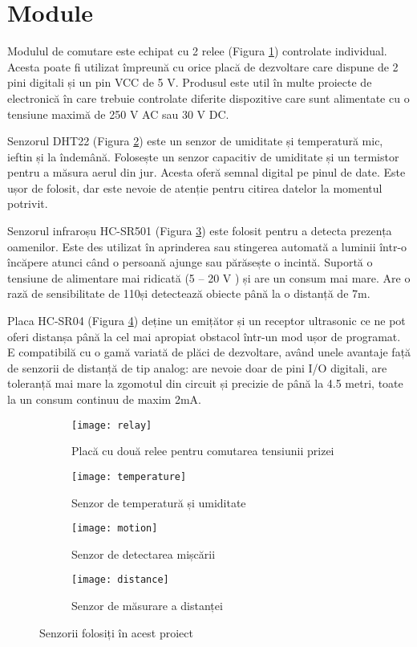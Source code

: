\break

\section{Module} 

Modulul de comutare este echipat cu 2 relee (Figura \ref{fig:relay}) controlate individual. Acesta poate fi utilizat împreună cu orice placă de dezvoltare care dispune de 2 pini digitali și un pin VCC de 5 V. Produsul este util în multe proiecte de electronică în care trebuie controlate diferite dispozitive care sunt alimentate cu o tensiune maximă de 250 V AC sau 30 V DC.

Senzorul DHT22 (Figura \ref{fig:temperature}) este un senzor de umiditate și temperatură mic, ieftin și la îndemână. Folosește un senzor capacitiv de umiditate și un termistor pentru a măsura aerul din jur. Acesta oferă semnal digital pe pinul de date. Este ușor de folosit, dar este nevoie de atenție pentru citirea datelor la momentul potrivit.

Senzorul infraroșu HC-SR501 (Figura \ref{fig:motion}) este folosit pentru a detecta prezența oamenilor. Este des utilizat în aprinderea sau stingerea automată a luminii într-o încăpere atunci când o persoană ajunge sau părăsește o incintă. Suportă o tensiune de alimentare mai ridicată (5 – 20 V ) și are un consum mai mare. Are o rază de sensibilitate de 110\textdegree și detectează obiecte până la o distanță de 7m.

Placa HC-SR04 (Figura \ref{fig:distance}) deține un emițător și un receptor ultrasonic ce ne pot oferi distanșa până la cel mai apropiat obstacol într-un mod ușor de programat. E compatibilă cu o gamă variată de plăci de dezvoltare, având unele avantaje față de senzorii de distanță de tip analog: are nevoie doar de pini I/O digitali, are toleranță mai mare la zgomotul din circuit și precizie de până la 4.5 metri, toate la un consum continuu de maxim 2mA.

\begin{figure}[h]
	\centering
	\begin{subfigure}{0.45\textwidth}
		\texttt{[image: relay]}
		\caption{Placă cu două relee pentru comutarea tensiunii prizei}
		\label{fig:relay}
	\end{subfigure}
	\hfill
	\begin{subfigure}{0.45\textwidth}
		\texttt{[image: temperature]}
		\caption{Senzor de temperatură și umiditate}
		\label{fig:temperature}
	\end{subfigure}
	\begin{subfigure}{0.45\textwidth}
		\texttt{[image: motion]}
		\caption{Senzor de detectarea mișcării}
		\label{fig:motion}
	\end{subfigure}
	\hfill
		\begin{subfigure}{0.45\textwidth}
		\texttt{[image: distance]}
		\caption{Senzor de măsurare a distanței}
		\label{fig:distance}
	\end{subfigure}
	\hfill
	\caption{Senzorii folosiți în acest proiect}
	\label{fig:all}
\end{figure}

